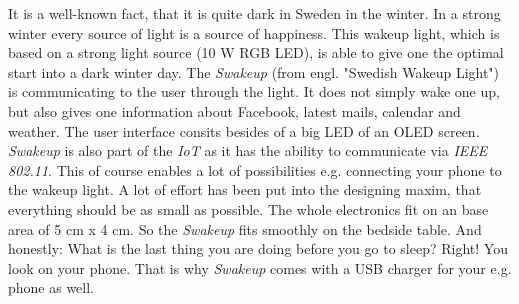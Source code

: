 It is a well-known fact, that it is quite dark in Sweden in the winter. In a strong winter every source of light is a source of happiness. This wakeup light, which is based on a strong light source (10 W RGB LED), is able to give one the optimal start into a dark winter day. The \textit{Swakeup} (from engl. "Swedish Wakeup Light") is communicating to the user through the light. It does not simply wake one up, but also gives one information about Facebook, latest mails, calendar and weather. The user interface consits besides of a big LED of an OLED screen. \textit{Swakeup} is also part of the \textit{IoT} as it has the ability to communicate via \textit{IEEE 802.11}. This of course enables a lot of possibilities e.g. connecting your phone to the wakeup light. A lot of effort has been put into the designing maxim, that everything should be as small as possible. The whole electronics fit on an base area of 5 cm x 4 cm. So the \textit{Swakeup} fits smoothly on the bedside table. And honestly: What is the last thing you are doing before you go to sleep? Right! You look on your phone. That is why \textit{Swakeup} comes with a USB charger for your e.g. phone as well.          
